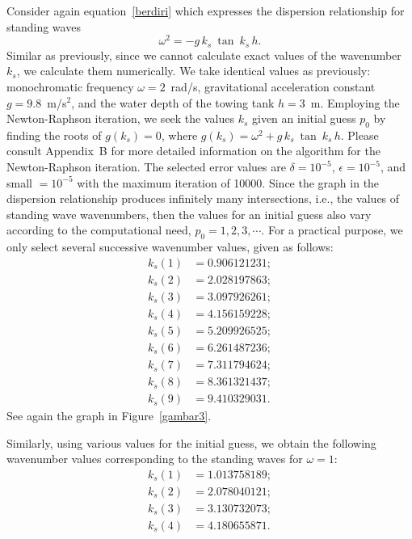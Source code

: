 \documentclass[12pt,a4paper]{report}
\begin{document}
Consider again equation~\eqref{berdiri} which expresses the dispersion relationship for standing waves
\begin{equation}
\omega^2 = -g \, k_{s} \: \tan \: k_{s} \,h.
\end{equation}
Similar as previously, since we cannot calculate exact values of the wavenumber $k_s$, we calculate them numerically. We take identical values as previously: monochromatic frequency $\omega = 2$~rad/s, gravitational acceleration constant $g = 9.8$~m/s$^2$, and the water depth of the towing tank $h = 3$~m. Employing the Newton-Raphson iteration, we seek the values $k_s$ given an initial guess $p_0$ by finding the roots of $g(k_{s}) = 0$, where $g(k_{s}) = \omega^2 + g \, k_{s} \: \tan \: k_{s}\,h$. Please consult Appendix~B for more detailed information on the algorithm for the Newton-Raphson iteration. The selected error values are $\delta = 10^{-5}$, $\epsilon = 10^{-5}$, and {\ttfamily small} $= 10^{-5}$ with the maximum iteration of 10000. Since the graph in the dispersion relationship produces infinitely many intersections, i.e., the values of standing wave wavenumbers, then the values for an initial guess also vary according to the computational need, $p_{0} = 1, 2, 3, \cdots$. For a practical purpose, we only select several successive wavenumber values, given as follows:
\begin{align*}
k_{s}(1) &= 0.906121231; \\
k_{s}(2) &= 2.028197863;  \\
k_{s}(3) &= 3.097926261;  \\
k_{s}(4) &= 4.156159228;  \\
k_{s}(5) &= 5.209926525;  \\
k_{s}(6) &= 6.261487236;  \\
k_{s}(7) &= 7.311794624;  \\
k_{s}(8) &= 8.361321437;  \\
k_{s}(9) &= 9.410329031.
\end{align*}
See again the graph in Figure~\ref{gambar3}.

Similarly, using various values for the initial guess, we obtain the following wavenumber values corresponding to the standing waves for $\omega = 1$:
\begin{align*}
k_{s}(1) &= 1.013758189;	\\
k_{s}(2) &= 2.078040121;	\\
k_{s}(3) &= 3.130732073;	\\
k_{s}(4) &= 4.180655871.
\end{align*}
\end{document}
